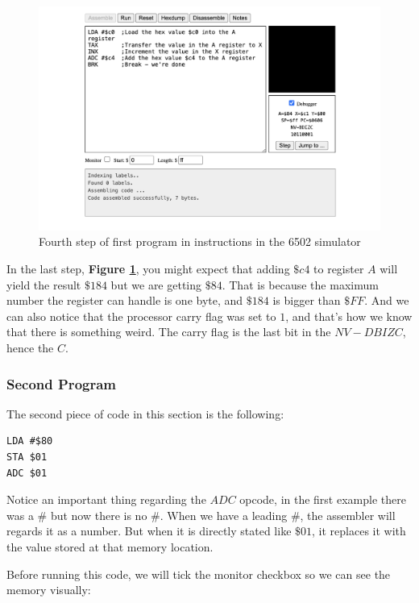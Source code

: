 \documentclass[a4paper]{article}
\begin{document}
\begin{figure}[H]
    \centering
    \includegraphics[width=1.0\textwidth]{res/images/q2/12-instructions-first-step4.png}
    \caption{Fourth step of first program in instructions in the 6502 simulator}
    \label{fig:12-instructions-first-step4}
\end{figure}

In the last step, \textbf{Figure \ref{fig:12-instructions-first-step4}}, you might expect that adding $\$c4$ to register $A$ will yield the result $\$184$ but we are getting $\$84$. That is because the maximum number the register can handle is one byte, and $\$184$ is bigger than $\$FF$. And we can also notice that the processor carry flag was set to $1$, and that's how we know that there is something weird. The carry flag is the last bit in the $NV-DBIZC$, hence the $C$.

\subsubsection{Second Program}

The second piece of code in this section is the following:

\begin{lstlisting}[style=6502asm]
LDA #$80
STA $01
ADC $01
\end{lstlisting}

Notice an important thing regarding the $ADC$ opcode, in the first example there was a $\#$ but now there is no $\#$. When we have a leading $\#$, the assembler will regards it as a number. But when it is directly stated like $\$01$, it replaces it with the value stored at that memory location.

Before running this code, we will tick the monitor checkbox so we can see the memory visually:
\end{document}
